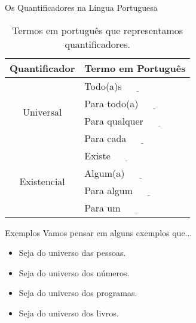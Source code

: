\documentclass[aspectratio=169]{beamer}
\begin{document}
	\begin{frame}{Os Quantificadores na Língua Portuguesa}
		\begin{table}[h]
			\centering
			\begin{tabular}{cl}
				\hline
				\textbf{Quantificador}  & \textbf{Termo em Portugu\^es} \\ \hline
				\multirow{4}{*}{Universal}    & Todo(a)s $\underline{ \ \ \ \ \ \ \ \ \ \ \ \ }$\\
				& Para todo(a) $\underline{ \ \ \ \ \ \ \ \ \ \ \ \ }$\\
				& Para qualquer $\underline{ \ \ \ \ \ \ \ \ \ \ \ \ }$\\
				& Para cada $\underline{ \ \ \ \ \ \ \ \ \ \ \ \ }$\\ \hline
				\multirow{4}{*}{Existencial} & Existe $\underline{ \ \ \ \ \ \ \ \ \ \ \ \ }$\\
				& Algum(a) $\underline{ \ \ \ \ \ \ \ \ \ \ \ \ }$\\
				& Para algum $\underline{ \ \ \ \ \ \ \ \ \ \ \ \ }$\\
				& Para um $\underline{ \ \ \ \ \ \ \ \ \ \ \ \ }$\\ \hline
			\end{tabular}
			\caption{Termos em português que representamos quantificadores.}
			\label{tab:QuantificadoresPT-BR}
		\end{table}
	\end{frame}

	\begin{frame}{Exemplos}
		Vamos pensar em alguns exemplos que...
		\begin{itemize}
			\item Seja do universo das pessoas.
			\item Seja do universo dos números.
			\item Seja do universo dos programas.
			\item Seja do universo dos livros.
		\end{itemize}
	\end{frame}
	
\end{document}
